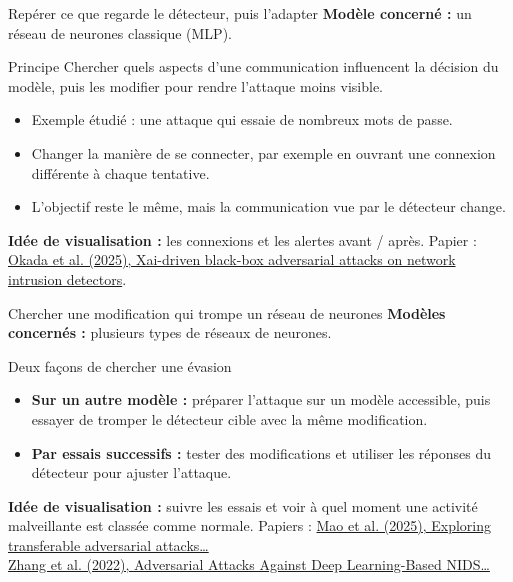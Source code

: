 \documentclass[aspectratio=169,11pt]{beamer}
\begin{document}
\begin{frame}{Repérer ce que regarde le détecteur, puis l'adapter}
  \textbf{Modèle concerné :} un réseau de neurones classique (MLP).
  \vspace{1em}
  \begin{block}{Principe}
    Chercher quels aspects d'une communication influencent la décision du modèle,
    puis les modifier pour rendre l'attaque moins visible.
  \end{block}
  \begin{itemize}
    \setlength{\itemsep}{.8em}
    \item Exemple étudié : une attaque qui essaie de nombreux mots de passe.
    \item Changer la manière de se connecter, par exemple en ouvrant
      une connexion différente à chaque tentative.
    \item L'objectif reste le même, mais la communication vue par le détecteur change.
  \end{itemize}
  \vfill
  \textbf{Idée de visualisation :} les connexions et les alertes avant / après.
  \vfill
  \footnotesize Papier : \href{https://doi.org/10.1007/s10207-025-01016-0}{Okada et al. (2025), Xai-driven black-box adversarial attacks on network intrusion detectors}.
\end{frame}

\begin{frame}{Chercher une modification qui trompe un réseau de neurones}
  \textbf{Modèles concernés :} plusieurs types de réseaux de neurones.
  \vspace{1em}
  \begin{block}{Deux façons de chercher une évasion}
    \begin{itemize}
      \setlength{\itemsep}{.8em}
      \item \textbf{Sur un autre modèle :} préparer l'attaque sur un modèle accessible,
        puis essayer de tromper le détecteur cible avec la même modification.
      \item \textbf{Par essais successifs :} tester des modifications et utiliser les
        réponses du détecteur pour ajuster l'attaque.
    \end{itemize}
  \end{block}
  \vfill
  \textbf{Idée de visualisation :} suivre les essais et voir à quel moment
  une activité malveillante est classée comme normale.
  \vfill
  \footnotesize Papiers : \href{https://doi.org/10.1016/j.jnca.2025.104255}{Mao et al. (2025), Exploring transferable adversarial attacks\ldots}
  \\ \href{https://doi.org/10.1109/TNET.2021.3137084}{Zhang et al. (2022), Adversarial Attacks Against Deep Learning-Based NIDS\ldots}
\end{frame}
\end{document}
